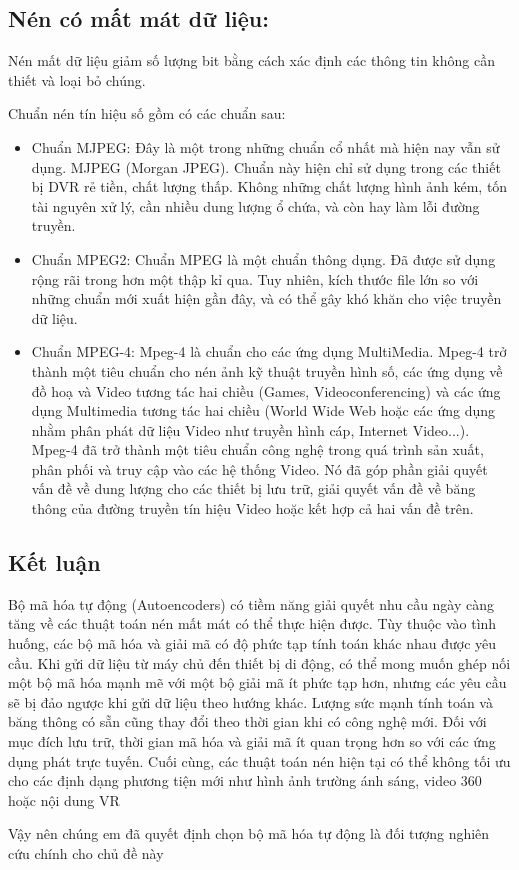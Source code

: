 \subsection{Nén có mất mát dữ liệu:}

Nén mất dữ liệu giảm số lượng bit bằng cách xác định các thông tin không cần thiết
và loại bỏ chúng.

Chuẩn nén tín hiệu số gồm có các chuẩn sau:

\begin{itemize}[leftmargin=1.5cm]
      \item Chuẩn MJPEG:
            Đây là một trong những chuẩn cổ nhất mà hiện nay vẫn sử dụng. MJPEG (Morgan JPEG). Chuẩn này hiện chỉ sử dụng trong các thiết bị DVR rẻ tiền, chất lượng thấp. Không những chất lượng hình ảnh kém, tốn tài nguyên xử lý, cần nhiều dung lượng ổ chứa, và còn hay làm lỗi đường truyền.
      \item Chuẩn MPEG2:
            Chuẩn MPEG là một chuẩn thông dụng. Đã được sử dụng rộng rãi trong hơn một thập kỉ qua. Tuy nhiên, kích thước file lớn so với những chuẩn mới xuất hiện gần đây, và có thể gây khó khăn cho việc truyền dữ liệu.
      \item Chuẩn MPEG-4:
            Mpeg-4 là chuẩn cho các ứng dụng MultiMedia. Mpeg-4 trở thành một tiêu chuẩn cho nén ảnh kỹ thuật truyền hình số, các ứng dụng về đồ hoạ và Video tương tác hai chiều (Games, Videoconferencing) và các ứng dụng Multimedia tương tác hai chiều (World Wide Web hoặc các ứng dụng nhằm phân phát dữ liệu Video như truyền hình cáp, Internet Video...). Mpeg-4 đã trở thành một tiêu chuẩn công nghệ trong quá trình sản xuất, phân phối và truy cập vào các hệ thống Video. Nó đã góp phần giải quyết vấn đề về dung lượng cho các thiết bị lưu trữ, giải quyết vấn đề về băng thông của đường truyền tín hiệu Video hoặc kết hợp cả hai vấn đề trên.


\end{itemize}

\subsection{Kết luận}



Bộ mã hóa tự động (Autoencoders) có tiềm năng giải quyết nhu cầu ngày càng
tăng về các thuật
toán nén mất mát có thể thực hiện được. Tùy thuộc vào tình huống,
các bộ mã hóa và giải mã có độ phức tạp tính toán khác nhau được yêu cầu.
Khi gửi dữ liệu từ máy chủ đến thiết bị di động, có thể mong muốn ghép nối
một bộ mã hóa mạnh mẽ với một bộ giải mã ít phức tạp hơn, nhưng các yêu cầu
sẽ bị đảo ngược khi gửi dữ liệu theo hướng khác. Lượng sức mạnh tính toán và
băng thông có sẵn cũng thay đổi theo thời gian khi có công nghệ mới.
Đối với mục đích lưu trữ, thời gian mã hóa và giải mã ít quan trọng hơn
so với các ứng dụng phát trực tuyến. Cuối cùng, các thuật toán nén hiện
tại có thể không tối ưu cho các định dạng phương tiện mới như hình ảnh
trường ánh sáng, video 360 hoặc nội dung VR

Vậy nên chúng em đã quyết định chọn bộ mã hóa tự động là đối tượng nghiên 
cứu chính cho chủ đề này

